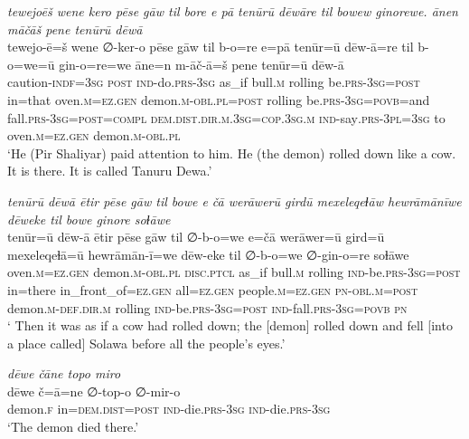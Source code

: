 \ea \label{ŽP.200}
\textit{tewejoēš wene kero pēse gāw til bore e pā tenūrū dēwāre til bowew ginorewe. ānen māčāš pene tenūrū dēwā} \\ 
\gll tewejo-ē=š wene ∅-ker-o pēse gāw til b-o=re e=pā tenūr=ū dēw-ā=re til b-o=we=ū gin-o=re=we āne=n m-āč-ā=š pene tenūr=ū dēw-ā \\ 
 caution\textsc{-indf}\textsc{=3sg} \textsc{post} \textsc{ind-}do\textsc{.prs}\textsc{-3sg} as\_if bull\textsc{.m} rolling be\textsc{.prs}\textsc{-3sg}\textsc{=\textsc{post}} in=that oven\textsc{.m}\textsc{\textsc{=ez.gen}} demon\textsc{.m}\textsc{-obl}\textsc{.pl}\textsc{=\textsc{post}} rolling be\textsc{.prs}\textsc{-3sg}\textsc{=\textsc{povb}}=and fall\textsc{.prs}\textsc{-3sg}\textsc{=\textsc{post}}\textsc{=compl} \textsc{dem.dist}\textsc{.dir}\textsc{.m}\textsc{.3sg}\textsc{=cop}\textsc{.3sg}\textsc{.m} \textsc{ind-}say\textsc{.prs}\textsc{-3pl}\textsc{=3sg} to oven\textsc{.m}\textsc{\textsc{=ez.gen}} demon\textsc{.m}\textsc{-obl}\textsc{.pl} \\ 
\glt `He (Pir Shaliyar) paid attention to him. He (the demon) rolled down like a cow. It is there. It is called Tanuru Dewa.'
\z 
 
\ea \label{ŽP.201}
\textit{tenūrū dēwā ētir pēse gāw til bowe e čā werāwerū girdū mexeleqeɫāw hewrāmānīwe dēweke til bowe ginore soɫāwe} \\ 
\gll tenūr=ū dēw-ā ētir pēse gāw til ∅-b-o=we e=čā werāwer=ū gird=ū mexeleqeɫā=ū hewrāmān-ī=we dēw-eke til ∅-b-o=we ∅-gin-o=re soɫāwe \\ 
 oven\textsc{.m}\textsc{\textsc{=ez.gen}} demon\textsc{.m}\textsc{-obl}\textsc{.pl} \textsc{disc.ptcl} as\_if bull\textsc{.m} rolling \textsc{ind-}be\textsc{.prs}\textsc{-3sg}\textsc{=\textsc{post}} in=there in\_front\_of\textsc{\textsc{=ez.gen}} all\textsc{\textsc{=ez.gen}} people\textsc{.m}\textsc{\textsc{=ez.gen}} \textsc{pn}\textsc{-obl}\textsc{.m}\textsc{=\textsc{post}} demon\textsc{.m}\textsc{-def}\textsc{.dir}\textsc{.m} rolling \textsc{ind-}be\textsc{.prs}\textsc{-3sg}\textsc{=\textsc{post}} \textsc{ind-}fall\textsc{.prs}\textsc{-3sg}\textsc{=\textsc{povb}} \textsc{pn} \\ 
\glt ` Then it was as if a cow had rolled down; the [demon] rolled down and fell [into a place called] Solawa before all the people’s eyes.'
\z 
 
\ea \label{ŽP.202}
\textit{dēwe čāne topo miro} \\ 
\gll dēwe č=ā=ne ∅-top-o ∅-mir-o \\ 
 demon\textsc{.f} in=\textsc{dem.dist}\textsc{=\textsc{post}} \textsc{ind-}die\textsc{.prs}\textsc{-3sg} \textsc{ind-}die\textsc{.prs}\textsc{-3sg} \\ 
\glt `The demon died there.'
\z 
 
